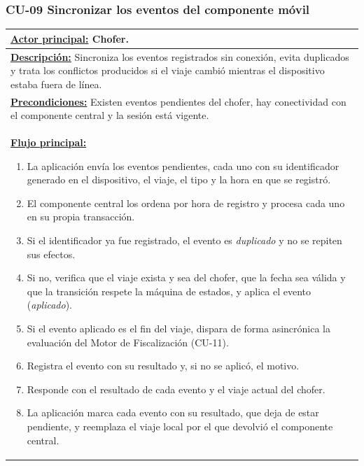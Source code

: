 \subsubsection{CU-09 Sincronizar los eventos del componente móvil}\label{sec:cu-09}
\begin{table}[H]
\small
\setlength{\tabcolsep}{8pt}
\renewcommand{\arraystretch}{1.1}
\centering
\begin{tabular}{|p{15.8cm}|}
\hline
\textbf{\underline{Actor principal:}} Chofer. \\ \hline
\textbf{\underline{Descripción:}} Sincroniza los eventos registrados sin conexión, evita duplicados y trata los conflictos producidos si el viaje cambió mientras el dispositivo estaba fuera de línea. \\ \hline
\textbf{\underline{Precondiciones:}} Existen eventos pendientes del chofer, hay conectividad con el componente central y la sesión está vigente. \\ \hline
\textbf{\underline{Flujo principal:}}\par
\begin{enumerate}[leftmargin=*,topsep=2pt,itemsep=1pt,parsep=0pt,partopsep=0pt]
    \item La aplicación envía los eventos pendientes, cada uno con su identificador generado en el dispositivo, el viaje, el tipo y la hora en que se registró.
    \item El componente central los ordena por hora de registro y procesa cada uno en su propia transacción.
    \item Si el identificador ya fue registrado, el evento es \emph{duplicado} y no se repiten sus efectos.
    \item Si no, verifica que el viaje exista y sea del chofer, que la fecha sea válida y que la transición respete la máquina de estados, y aplica el evento (\emph{aplicado}).
    \item Si el evento aplicado es el fin del viaje, dispara de forma asincrónica la evaluación del Motor de Fiscalización (CU-11).
    \item Registra el evento con su resultado y, si no se aplicó, el motivo.
    \item Responde con el resultado de cada evento y el viaje actual del chofer.
    \item La aplicación marca cada evento con su resultado, que deja de estar pendiente, y reemplaza el viaje local por el que devolvió el componente central.
\end{enumerate} \\ \hline

\end{tabular}
\end{table}

